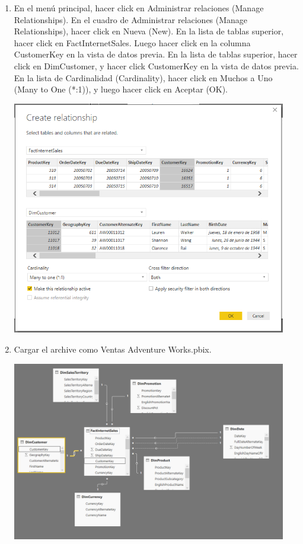 \begin{enumerate}[1.]
\item En el menú principal, hacer click en Administrar relaciones (Manage Relationships). En el cuadro de Administrar relaciones (Manage Relationships), hacer click en Nueva (New). En la lista de tablas superior, hacer click en FactInternetSales. Luego hacer click en la columna CustomerKey en la vista de datos previa. En la lista de tablas superior, hacer click en DimCustomer, y hacer click CustomerKey en la vista de datos previa. En la lista de Cardinalidad (Cardinality), hacer click en Muchos a Uno (Many to One (*:1)), y luego hacer click en Aceptar (OK).
	\begin{center}
	\includegraphics[width=12cm]{./Imagenes/13} 
	\end{center}

\item Cargar el archive como Ventas Adventure Works.pbix.
	\begin{center}
	\includegraphics[width=12cm]{./Imagenes/14} 
	\end{center}

\end{enumerate}




